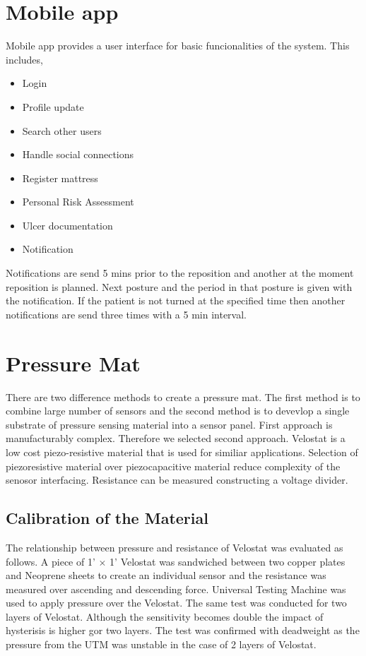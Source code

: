 \section{Mobile app} 

Mobile app provides a user interface for basic funcionalities of the system. This includes,
\begin{itemize}
	\item Login
	\item Profile update
	\item Search other users
	\item Handle social connections
	\item Register mattress
	\item Personal Risk Assessment
	\item Ulcer documentation
	\item Notification
\end{itemize}

Notifications are  send 5  mins prior to the reposition and another at the moment reposition is planned. Next posture and the period in that posture is given with the notification. If the patient is not turned at the specified time then another notifications are send three times with a 5 min interval.




\section{Pressure Mat}

There are two difference methods to create a pressure mat. The first method is to combine large number of sensors and the second method is to devevlop a single substrate of pressure sensing material into a sensor panel. First approach is manufacturably complex. Therefore we selected second approach. Velostat\textsuperscript{\textregistered} is a low cost piezo-resistive material that is used for similiar applications. \cite{velostat1,velostat2,velsensor} Selection of piezoresistive material over piezocapacitive material reduce complexity of the senosor interfacing. Resistance can be measured constructing a voltage divider. 


\subsection{Calibration of the Material}

The relationship between pressure and resistance of Velostat was evaluated as follows. A piece of 1' $\times$ 1' Velostat was sandwiched between two copper plates and Neoprene sheets to create an individual sensor and the resistance was measured over ascending and descending force. 
 Universal Testing Machine was used to apply pressure over the Velostat. The same test was conducted for two layers of Velostat. Although the sensitivity becomes double the impact of hysterisis is higher gor two layers. The test was confirmed with deadweight as the pressure from the UTM was unstable in the case of 2 layers of Velostat.


